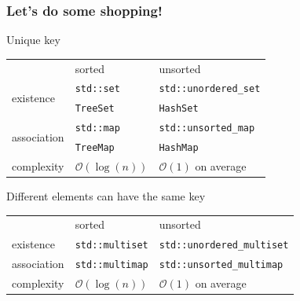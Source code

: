 \documentclass[10pt,svgnames,usenames,table]{beamer} %
\newcommand{\bigoh}{\mathcal{O}}
\begin{document}
\begin{frame}
  \frametitle{Let's do some shopping!}
  \begin{block}{Unique key}
    \begin{center}
      \begin{tabular}{lll}
        & sorted & unsorted\\
        \multirow{2}{*}{existence} & \lstinline|std::set| & \lstinline|std::unordered_set|\\
                  & \lstinline|TreeSet|  & \lstinline|HashSet|\\
        \multirow{2}{*}{association} & \lstinline|std::map| & \lstinline|std::unsorted_map|\\
                    & \lstinline|TreeMap|  & \lstinline|HashMap|\\
        complexity & $\bigoh(\log(n))$ & $\bigoh(1)$ on average
      \end{tabular}
    \end{center}
  \end{block}
  \begin{block}{Different elements can have the same key}
    \begin{center}
      \begin{tabular}{lll}
        & sorted & unsorted\\
        existence & \lstinline|std::multiset| & \lstinline|std::unordered_multiset|\\
        association & \lstinline|std::multimap| & \lstinline|std::unsorted_multimap|\\
        complexity & $\bigoh(\log(n))$ & $\bigoh(1)$ on average
      \end{tabular}
    \end{center}
  \end{block}
\end{frame}
\end{document}
